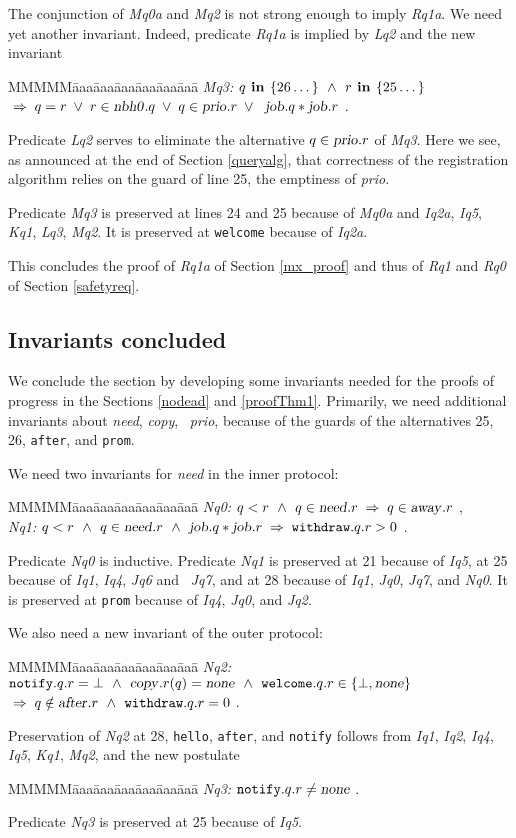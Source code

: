 \documentclass[10pt]{article} \usepackage[english]{babel}
\newenvironment{tab}{\begin{tabbing}
MMMMM\=aaa\=aaa\=aaa\=aaa\=aaa\=aaa\= \kill}{\end{tabbing}}
\def\S #1/{\mbox {\textsl{#1}}}
\def\B #1/{\mbox {\textbf{#1}}}
\def\T #1/{\mbox {\texttt{#1}}}
\def\Implies{\;\Rightarrow\;}
\def\Land   {\mbox{ $\;\land\;$ }}
\def\Lor    {\;\lor\;}
\begin{document}
The conjunction of \S Mq0a/ and \S Mq2/ is not strong enough to imply
\S Rq1a/.  We need yet another invariant. Indeed, predicate \S Rq1a/
is implied by \S Lq2/ and the new invariant
\begin{tab}
  \S Mq3:/ \> $ q\B\ in /\{26\dots\} \Land r\B\ in /\{25\dots\} $ \\
  \> $ \Implies q = r\Lor r \in\S nbh0/.q \Lor q\in\S prio/.r \Lor \S
  job/.q * \S job/.r$ .
\end{tab}
Predicate \S Lq2/ serves to eliminate the alternative $q\in\S prio/.r$
of \S Mq3/.  Here we see, as announced at the end of Section
\ref{queryalg}, that correctness of the registration algorithm relies
on the guard of line 25, the emptiness of \S prio/.

Predicate \S Mq3/ is preserved at lines 24 and 25 because of \S Mq0a/
and \S Iq2a/, \S Iq5/, \S Kq1/, \S Lq3/, \S Mq2/.  It is preserved at
\T welcome/ because of \S Iq2a/.

This concludes the proof of \S Rq1a/ of Section \ref{mx_proof} and
thus of \S Rq1/ and \S Rq0/ of Section \ref{safetyreq}.

\subsection{Invariants concluded} \label{invarProgress}

We conclude the section by developing some invariants needed for the
proofs of progress in the Sections \ref{nodead} and \ref{proofThm1}.
Primarily, we need additional invariants about \S need/, \S copy/, \S
prio/, because of the guards of the alternatives 25, 26, \T after/,
and \T prom/.

We need two invariants for \S need/ in the inner protocol:
\begin{tab}
\S Nq0:/ \> $ q < r \Land q\in\S need/.r \Implies q\in\S away/.r $ ,\\
\S Nq1:/ \> $ q < r \Land q\in \S need/.r \Land \S job/.q * \S job/.r
\Implies \T withdraw/.q.r > 0 $ .
\end{tab}
Predicate \S Nq0/ is inductive.  Predicate \S Nq1/ is preserved at 21
because of \S Iq5/, at 25 because of \S Iq1/, \S Iq4/, \S Jq6/ and \S
Jq7/, and at 28 because of \S Iq1/, \S Jq0/, \S Jq7/, and \S Nq0/.  It
is preserved at \T prom/ because of \S Iq4/, \S Jq0/, and \S Jq2/.

We also need a new invariant of the outer protocol:
\begin{tab}
  \S Nq2:/ \> $ \T notify/.q.r = \bot \Land \S copy/.r(q) = \S none/ 
\Land \T welcome/.q.r \in\{ \bot, \S none/\} $ \\
  \> $ \Implies q\notin\S after/.r \Land \T withdraw/.q.r = 0 $ .
\end{tab}
Preservation of \S Nq2/ at 28, \T hello/, \T after/, and \T notify/
follows from \S Iq1/, \S Iq2/, \S Iq4/, \S Iq5/, \S Kq1/, \S Mq2/, and
the new postulate
\begin{tab}
\S Nq3:/ \> $ \T notify/.q.r \ne \S none/ $ .
\end{tab}
Predicate \S Nq3/ is preserved at 25 because of \S Iq5/. 
\end{document}

